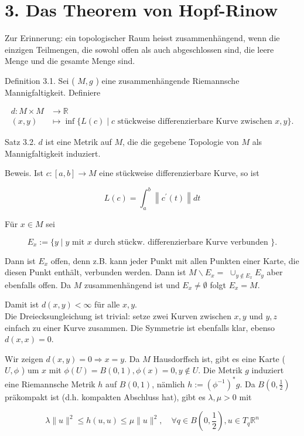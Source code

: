 \documentclass[10pt, letterpaper]{article}
\begin{document}
\section*{3. Das Theorem von Hopf-Rinow}
Zur Erinnerung: ein topologischer Raum heisst zusammenhängend, wenn die einzigen Teilmengen, die sowohl offen als auch abgeschlossen sind, die leere Menge und die gesamte Menge sind.

Definition 3.1. Sei ( $M, g$ ) eine zusammenhängende Riemannsche Mannigfaltigkeit. Definiere

$$
\begin{aligned}
d: M \times M & \rightarrow \mathbb{R} \\
(x, y) & \mapsto \inf \{L(c) \mid c \text { stückweise differenzierbare Kurve zwischen } x, y\} .
\end{aligned}
$$

Satz 3.2. $d$ ist eine Metrik auf $M$, die die gegebene Topologie von $M$ als Mannigfaltigkeit induziert.

Beweis. Ist $c:[a, b] \rightarrow M$ eine stückweise differenzierbare Kurve, so ist

$$
L(c)=\int_{a}^{b}\left\|c^{\prime}(t)\right\| d t
$$

Für $x \in M$ sei

$$
E_{x}:=\{y \mid y \text { mit } x \text { durch stückw. differenzierbare Kurve verbunden }\} .
$$

Dann ist $E_{x}$ offen, denn z.B. kann jeder Punkt mit allen Punkten einer Karte, die diesen Punkt enthält, verbunden werden. Dann ist $M \backslash E_{x}=$ $\cup_{y \notin E_{x}} E_{y}$ aber ebenfalls offen. Da $M$ zusammenhängend ist und $E_{x} \neq \emptyset$ folgt $E_{x}=M$.

Damit ist $d(x, y)<\infty$ für alle $x, y$.\\
Die Dreiecksungleichung ist trivial: setze zwei Kurven zwischen $x, y$ und $y, z$ einfach zu einer Kurve zusammen. Die Symmetrie ist ebenfalls klar, ebenso $d(x, x)=0$.

Wir zeigen $d(x, y)=0 \Longrightarrow x=y$. Da $M$ Hausdorffsch ist, gibt es eine Karte ( $U, \phi$ ) um $x$ mit $\phi(U)=B(0,1), \phi(x)=0, y \notin U$. Die Metrik $g$ induziert eine Riemannsche Metrik $h$ auf $B(0,1)$, nämlich $h:=\left(\phi^{-1}\right)^{*} g$. Da $B\left(0, \frac{1}{2}\right)$ präkompakt ist (d.h. kompakten Abschluss hat), gibt es $\lambda, \mu>0$ mit

$$
\lambda\|u\|^{2} \leq h(u, u) \leq \mu\|u\|^{2}, \quad \forall q \in B\left(0, \frac{1}{2}\right), u \in T_{q} \mathbb{R}^{n}
$$
\end{document}
